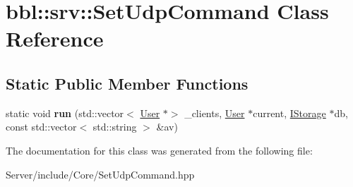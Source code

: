 \hypertarget{classbbl_1_1srv_1_1_set_udp_command}{}\section{bbl\+:\+:srv\+:\+:Set\+Udp\+Command Class Reference}
\label{classbbl_1_1srv_1_1_set_udp_command}
\subsection*{Static Public Member Functions}
\begin{DoxyCompactItemize}
\item 
\mbox{\label{classbbl_1_1srv_1_1_set_udp_command_aad8d38f9c3f1740805c20ee5547221ee}} 
static void {\bfseries run} (std\+::vector$<$ \hyperlink{classbbl_1_1srv_1_1_user}{User} $\ast$$>$ \+\_\+clients, \hyperlink{classbbl_1_1srv_1_1_user}{User} $\ast$current, \hyperlink{classbbl_1_1srv_1_1_i_storage}{I\+Storage} $\ast$db, const std\+::vector$<$ std\+::string $>$ \&av)
\end{DoxyCompactItemize}


The documentation for this class was generated from the following file\+:\begin{DoxyCompactItemize}
\item 
Server/include/\+Core/Set\+Udp\+Command.\+hpp\end{DoxyCompactItemize}
